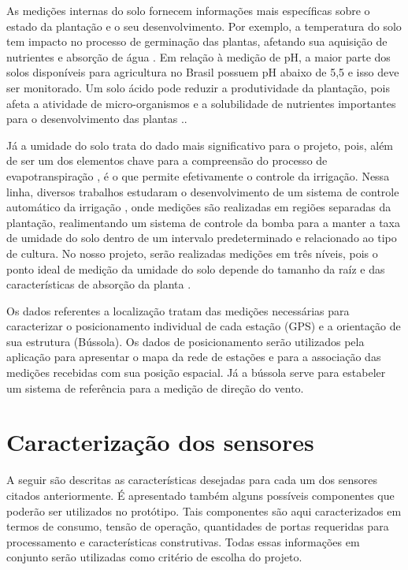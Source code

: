 	As medições internas do solo fornecem informações mais específicas sobre o estado da plantação e o seu desenvolvimento. Por exemplo, a temperatura do solo tem impacto no processo de germinação das plantas, afetando sua aquisição de nutrientes e absorção de água \cite{bib_sen_01_jose}. Em relação à medição de pH, a maior parte dos solos disponíveis para agricultura no Brasil possuem pH abaixo de 5,5 e isso deve ser monitorado. Um solo ácido pode reduzir a produtividade da plantação, pois afeta a atividade de micro-organismos e a solubilidade de nutrientes importantes para o desenvolvimento das plantas \cite{bib_sen_04_veloso}.. 
	
	Já a umidade do solo trata do dado mais significativo para o projeto, pois, além de ser um dos elementos chave para a compreensão do processo de evapotranspiração \cite{purdy2018smap}, é o que permite efetivamente o controle da irrigação. Nessa linha, diversos trabalhos estudaram o desenvolvimento de um sistema de controle automático da irrigação \cite{romero2012research} \cite{zhao2009study}, onde medições são realizadas em regiões separadas da plantação, realimentando um sistema de controle da bomba para a manter a taxa de umidade do solo dentro de um intervalo predeterminado e relacionado ao tipo de cultura. No nosso projeto, serão realizadas medições em três níveis, pois o ponto ideal de medição da umidade do solo depende do tamanho da raíz e das características de absorção da planta \cite{su2014critical}.
	
	Os dados referentes a localização tratam das medições necessárias para caracterizar o posicionamento individual de cada estação (GPS) e a orientação de sua estrutura (Bússola). Os dados de posicionamento serão utilizados pela aplicação para apresentar o mapa da rede de estações e para a associação das medições recebidas com sua posição espacial. Já a bússola serve para estabeler um sistema de referência para a medição de direção do vento.
	
\section{Caracterização dos sensores}
	A seguir são descritas as características desejadas para cada um dos sensores citados anteriormente. É apresentado também alguns possíveis componentes que poderão ser utilizados no protótipo. Tais componentes são aqui caracterizados em termos de consumo, tensão de operação, quantidades de portas requeridas para processamento e características construtivas. Todas essas informações em conjunto serão utilizadas como critério de escolha do projeto.
		
